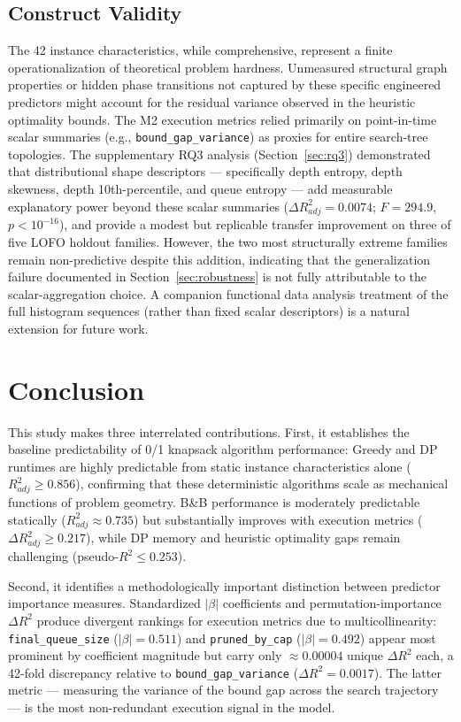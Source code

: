 \documentclass[sigconf]{acmart}
\begin{document}
\subsection{Construct Validity}
The 42 instance characteristics, while comprehensive, represent a finite operationalization of theoretical problem hardness. Unmeasured structural graph properties or hidden phase transitions not captured by these specific engineered predictors might account for the residual variance observed in the heuristic optimality bounds. The M2 execution metrics relied primarily on point-in-time scalar summaries (e.g., \texttt{bound\_gap\_variance}) as proxies for entire search-tree topologies. The supplementary RQ3 analysis (Section~\ref{sec:rq3}) demonstrated that distributional shape descriptors --- specifically depth entropy, depth skewness, depth 10th-percentile, and queue entropy --- add measurable explanatory power beyond these scalar summaries ($\Delta R^2_{adj} = 0.0074$; $F = 294.9$, $p < 10^{-16}$), and provide a modest but replicable transfer improvement on three of five LOFO holdout families. However, the two most structurally extreme families remain non-predictive despite this addition, indicating that the generalization failure documented in Section~\ref{sec:robustness} is not fully attributable to the scalar-aggregation choice. A companion functional data analysis treatment of the full histogram sequences (rather than fixed scalar descriptors) is a natural extension for future work.

\section{Conclusion}

This study makes three interrelated contributions. First, it establishes the baseline predictability of 0/1 knapsack algorithm performance: Greedy and DP runtimes are highly predictable from static instance characteristics alone ($R^2_{adj} \ge 0.856$), confirming that these deterministic algorithms scale as mechanical functions of problem geometry. B\&B performance is moderately predictable statically ($R^2_{adj} \approx 0.735$) but substantially improves with execution metrics ($\Delta R^2_{adj} \ge 0.217$), while DP memory and heuristic optimality gaps remain challenging (pseudo-$R^2 \le 0.253$).

Second, it identifies a methodologically important distinction between predictor importance measures. Standardized $|\beta|$ coefficients and permutation-importance $\Delta R^2$ produce divergent rankings for execution metrics due to multicollinearity: \texttt{final\_queue\_size} ($|\beta| = 0.511$) and \texttt{pruned\_by\_cap} ($|\beta| = 0.492$) appear most prominent by coefficient magnitude but carry only $\approx 0.00004$ unique $\Delta R^2$ each, a 42-fold discrepancy relative to \texttt{bound\_gap\_variance} ($\Delta R^2 = 0.0017$). The latter metric --- measuring the variance of the bound gap across the search trajectory --- is the most non-redundant execution signal in the model.
\end{document}
